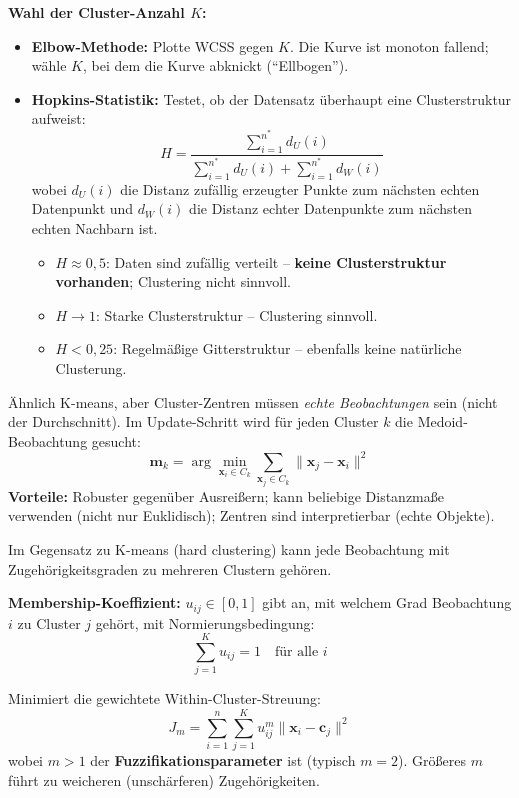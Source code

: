 \textbf{Wahl der Cluster-Anzahl $K$:}
\begin{itemize}[leftmargin=1.5em]
    \item \textbf{Elbow-Methode:} Plotte WCSS gegen $K$. Die Kurve ist monoton fallend; wähle $K$, bei dem die Kurve abknickt (``Ellbogen'').
    \item \textbf{Hopkins-Statistik:} Testet, ob der Datensatz überhaupt eine Clusterstruktur aufweist: $$H = \frac{\sum_{i=1}^{n^*} d_U(i)}{\sum_{i=1}^{n^*} d_U(i) + \sum_{i=1}^{n^*} d_W(i)}$$ wobei $d_U(i)$ die Distanz zufällig erzeugter Punkte zum nächsten echten Datenpunkt und $d_W(i)$ die Distanz echter Datenpunkte zum nächsten echten Nachbarn ist.
    \begin{itemize}[leftmargin=1.5em]     \item $H \approx 0{,}5$: Daten sind zufällig verteilt -- \textbf{keine
        Clusterstruktur vorhanden}; Clustering nicht sinnvoll.
        \item $H \to 1$: Starke Clusterstruktur -- Clustering sinnvoll.
        \item $H < 0{,}25$: Regelmäßige Gitterstruktur -- ebenfalls keine natürliche
        Clusterung.
    \end{itemize}
\end{itemize}

Ähnlich K-means, aber Cluster-Zentren müssen \emph{echte Beobachtungen} sein (nicht
der Durchschnitt). Im Update-Schritt wird für jeden Cluster $k$ die Medoid-Beobachtung
gesucht:
$$\mathbf{m}_k = \arg\min_{\mathbf{x}_i \in C_k} \sum_{\mathbf{x}_j \in C_k}
\|\mathbf{x}_j - \mathbf{x}_i\|^2$$ 
\textbf{Vorteile:} Robuster gegenüber Ausreißern; kann beliebige Distanzmaße verwenden
(nicht nur Euklidisch); Zentren sind interpretierbar (echte Objekte).

Im Gegensatz zu K-means (hard clustering) kann jede Beobachtung mit Zugehörigkeits\-graden
zu mehreren Clustern gehören.

\textbf{Membership-Koeffizient:} $u_{ij} \in [0, 1]$ gibt an, mit welchem Grad
Beobachtung $i$ zu Cluster $j$ gehört, mit Normierungsbedingung:
$$\sum_{j=1}^{K} u_{ij} = 1 \quad \text{für alle } i$$

 Minimiert die gewichtete Within-Cluster-Streuung: $$J_m = \sum_{i=1}^{n} \sum_{j=1}^{K} u_{ij}^m \|\mathbf{x}_i - \mathbf{c}_j\|^2$$ wobei $m > 1$ der \textbf{Fuzzifikationsparameter} ist (typisch $m = 2$). Größeres $m$ führt zu weicheren (unschärferen) Zugehörigkeiten.

